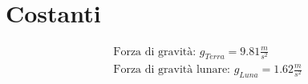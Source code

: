 \section{Costanti}

\begin{gather*}
\text{Forza di gravità: } g_{Terra} = 9.81 \frac{m}{s^2} \\
\text{Forza di gravità lunare: } g_{Luna} = 1.62 \frac{m}{s^2} \\
\end{gather*}